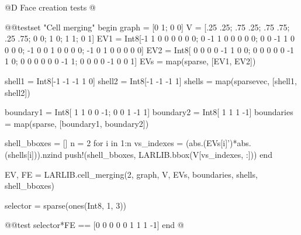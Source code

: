 @D Face creation tests
@{@@testset "Cell merging" begin
    graph = [0 1; 0 0]
    V = [.25 .25; .75 .25; .75 .75; .25 .75;
           0   0;   1   0;   1   1;   0   1]
    EV1 = Int8[-1  1  0  0  0  0  0  0;
                0 -1  1  0  0  0  0  0;
                0  0 -1  1  0  0  0  0;
               -1  0  0  1  0  0  0  0;
               -1  0  1  0  0  0  0  0]
    EV2 = Int8[ 0  0  0  0 -1  1  0  0;
                0  0  0  0  0 -1  1  0;
                0  0  0  0  0  0 -1  1;
                0  0  0  0 -1  0  0  1]
    EVs = map(sparse, [EV1, EV2])

    shell1 = Int8[-1 -1 -1  1  0]
    shell2 = Int8[-1 -1 -1  1]
    shells = map(sparsevec, [shell1, shell2])

    boundary1 = Int8[ 1  1  0  0 -1;
                      0  0  1 -1  1]
    boundary2 = Int8[ 1  1  1 -1]
    boundaries = map(sparse, [boundary1, boundary2])

    shell_bboxes = []
    n = 2
    for i in 1:n
        vs_indexes = (abs.(EVs[i]')*abs.(shells[i])).nzind
        push!(shell_bboxes, LARLIB.bbox(V[vs_indexes, :]))
    end

    EV, FE = LARLIB.cell_merging(2, graph, V, EVs, boundaries, shells, shell_bboxes)

    selector = sparse(ones(Int8, 1, 3))

    @@test selector*FE == [0  0  0  0  0  1  1  1 -1]
end
@}